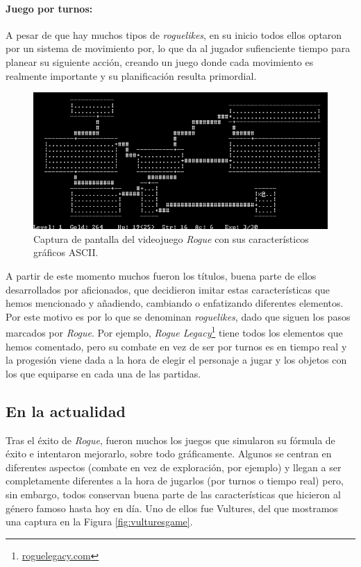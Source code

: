 \paragraph{Juego por turnos:} A pesar de que hay muchos tipos de \textit{roguelikes}, en su inicio todos ellos optaron por un sistema de movimiento por, lo que da al jugador sufienciente tiempo para planear su siguiente acción, creando un juego donde cada movimiento es realmente importante y su planificación resulta primordial.

\begin{figure}[h!]
		\includegraphics[width=\textwidth,height=\textheight,keepaspectratio]{./img/roguegame.PNG}
	\caption{Captura de pantalla del videojuego \textit{Rogue} con sus característicos gráficos ASCII.}
	\label{fig:roguegame}
\end{figure}

A partir de este momento muchos fueron los títulos, buena parte de ellos desarrollados por aficionados, que decidieron imitar estas características que hemos mencionado y añadiendo, cambiando o enfatizando diferentes elementos. Por este motivo es por lo que se denominan \textit{roguelikes}, dado que siguen los pasos marcados por \textit{Rogue}.
Por ejemplo, \textit{Rogue Legacy}\footnote{\url{roguelegacy.com}} tiene todos los elementos que hemos comentado, pero su combate en vez de ser por turnos es en tiempo real y la progesión viene dada a la hora de elegir el personaje a jugar y los objetos con los que equiparse en cada una de las partidas.

\subsection{En la actualidad}

Tras el éxito de \textit{Rogue}, fueron muchos los juegos que simularon su fórmula de éxito e intentaron mejorarlo, sobre todo gráficamente.\cite{Craddock2015a} Algunos se centran en diferentes aspectos (combate en vez de exploración, por ejemplo) y llegan a ser completamente diferentes a la hora de jugarlos (por turnos o tiempo real) pero, sin embargo, todos conservan buena parte de las características que hicieron al género famoso hasta hoy en día. Uno de ellos fue Vultures, del que mostramos una captura en la Figura \ref{fig:vulturesgame}. 

